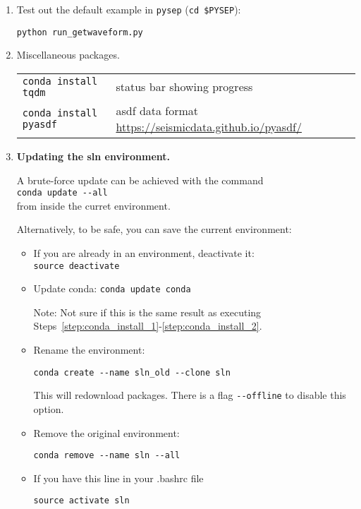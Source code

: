 \documentclass[10pt,titlepage,fleqn]{article}
\begin{document}
\begin{enumerate}
\item Test out the default example in \verb+pysep+ (\verb+cd $PYSEP+):
%
\begin{verbatim}
python run_getwaveform.py
\end{verbatim}

\item Miscellaneous packages.

\begin{tabular}{ll}
\verb+conda install tqdm+ & status bar showing progress \\
\verb+conda install pyasdf+ & asdf data format \url{https://seismicdata.github.io/pyasdf/}
\end{tabular}


\item {\bf Updating the sln environment.}
\label{step:update}

A brute-force update can be achieved with the command \\
\verb+conda update --all+ \\
from inside the curret environment.

Alternatively, to be safe, you can save the current environment:
%
\begin{itemize}
\item If you are already in an environment, deactivate it: \\
\verb+source deactivate+

\item Update conda: \verb+conda update conda+

Note: Not sure if this is the same result as executing Steps~\ref{step:conda_install_1}-\ref{step:conda_install_2}.

\item Rename the environment:
\begin{verbatim}
conda create --name sln_old --clone sln
\end{verbatim}

This will redownload packages. There is a flag \verb+--offline+ to disable this option.

\item Remove the original environment:
\begin{verbatim}
conda remove --name sln --all
\end{verbatim}

\item If you have this line in your .bashrc file

\verb+source activate sln+


\end{itemize}
\end{enumerate}
\end{document}
